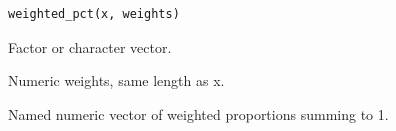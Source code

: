 \documentclass[a4paper]{book}
\begin{document}
%
\begin{Usage}
\begin{verbatim}
weighted_pct(x, weights)
\end{verbatim}
\end{Usage}
%
\begin{Arguments}
\begin{ldescription}
\item[\code{x}] Factor or character vector.

\item[\code{weights}] Numeric weights, same length as x.
\end{ldescription}
\end{Arguments}
%
\begin{Value}
Named numeric vector of weighted proportions summing to 1.
\end{Value}
\printindex{}
\end{document}
